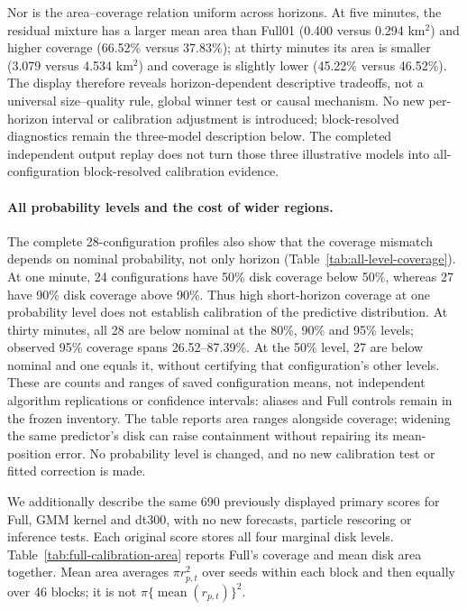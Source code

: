 Nor is the area--coverage relation uniform across horizons. At five minutes,
the residual mixture has a larger mean area than Full01 (0.400 versus
0.294 km\(^{2}\)) and higher coverage (66.52\% versus 37.83\%); at thirty
minutes its area is smaller (3.079 versus 4.534 km\(^{2}\)) and coverage
is slightly lower (45.22\% versus 46.52\%). The display therefore reveals
horizon-dependent descriptive tradeoffs, not a universal size--quality rule,
global winner test or causal mechanism. No new per-horizon interval or
calibration adjustment is introduced; block-resolved diagnostics remain
the three-model description below. The completed independent output replay
does not turn those three illustrative models into all-configuration
block-resolved calibration evidence.

\FloatBarrier

\paragraph{All probability levels and the cost of wider regions.}
The complete 28-configuration profiles also show that the coverage mismatch
depends on nominal probability, not only horizon
(Table~\ref{tab:all-level-coverage}). At one minute, 24 configurations have
50\% disk coverage below 50\%, whereas 27 have 90\% disk coverage above
90\%. Thus high short-horizon coverage at one probability level does not
establish calibration of the predictive distribution. At thirty minutes,
all 28 are below nominal at the 80\%, 90\% and 95\% levels; observed
95\% coverage spans 26.52--87.39\%. At the 50\% level, 27 are below
nominal and one equals it, without certifying that configuration's other
levels. These are counts and ranges of saved configuration means, not
independent algorithm replications or confidence intervals: aliases and
Full controls remain in the frozen inventory. The table reports area
ranges alongside coverage; widening the same predictor's disk can raise
containment without repairing its mean-position error. No probability
level is changed, and no new calibration test or fitted correction is made.

We additionally describe the same 690 previously displayed primary scores
for Full, GMM kernel and dt300, with no new forecasts, particle rescoring or
inference tests. Each original score stores all four marginal disk levels.
Table~\ref{tab:full-calibration-area} reports Full's coverage and mean disk
area together. Mean area averages \(\pi r_{p,t}^2\) over seeds within each
block and then equally over 46 blocks; it is not
\(\pi\{\operatorname{mean}(r_{p,t})\}^2\).

